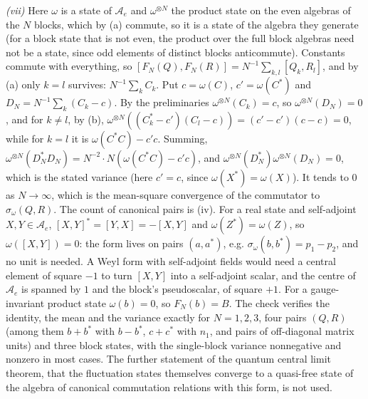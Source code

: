 \emph{(vii)} Here $\omega$ is a state of $\mathcal{A}_{e}$ and $\omega^{\otimes N}$ the product state on the even algebras of the $N$ blocks, which by (a) commute, so it is a state of the algebra they generate (for a block state that is not even, the product over the full block algebras need not be a state, since odd elements of distinct blocks anticommute). Constants commute with everything, so $[F_{N}(Q), F_{N}(R)] = N^{-1}\sum_{k,l}[Q_{k}, R_{l}]$, and by (a) only $k = l$ survives: $N^{-1}\sum_{k}C_{k}$. Put $c = \omega(C)$, $c' = \omega(C^{*})$ and $D_{N} = N^{-1}\sum_{k}(C_{k} - c)$. By the preliminaries $\omega^{\otimes N}(C_{k}) = c$, so $\omega^{\otimes N}(D_{N}) = 0$, and for $k \ne l$, by (b), $\omega^{\otimes N}((C_{k}^{*} - c')(C_{l} - c)) = (c' - c')(c - c) = 0$, while for $k = l$ it is $\omega(C^{*}C) - c'c$. Summing, $\omega^{\otimes N}(D_{N}^{*}D_{N}) = N^{-2}\cdot N(\omega(C^{*}C) - c'c)$, and $\omega^{\otimes N}(D_{N}^{*})\omega^{\otimes N}(D_{N}) = 0$, which is the stated variance (here $c' = c$, since $\omega(X^{*}) = \omega(X)$). It tends to $0$ as $N \to \infty$, which is the mean-square convergence of the commutator to $\sigma_{\omega}(Q, R)$. The count of canonical pairs is (iv). For a real state and self-adjoint $X, Y \in \mathcal{A}_{e}$, $[X, Y]^{*} = [Y, X] = -[X, Y]$ and $\omega(Z^{*}) = \omega(Z)$, so $\omega([X, Y]) = 0$: the form lives on pairs $(a, a^{*})$, e.g. $\sigma_{\omega}(b, b^{*}) = p_{1} - p_{2}$, and no unit is needed. A Weyl form with self-adjoint fields would need a central element of square $-1$ to turn $[X, Y]$ into a self-adjoint scalar, and the centre of $\mathcal{A}_{e}$ is spanned by $1$ and the block's pseudoscalar, of square $+1$. For a gauge-invariant product state $\omega(b) = 0$, so $F_{N}(b) = B$. The check verifies the identity, the mean and the variance exactly for $N = 1, 2, 3$, four pairs $(Q, R)$ (among them $b + b^{*}$ with $b - b^{*}$, $c + c^{*}$ with $n_{1}$, and pairs of off-diagonal matrix units) and three block states, with the single-block variance nonnegative and nonzero in most cases. The further statement of the quantum central limit theorem, that the fluctuation states themselves converge to a quasi-free state of the algebra of canonical commutation relations with this form, is not used.
